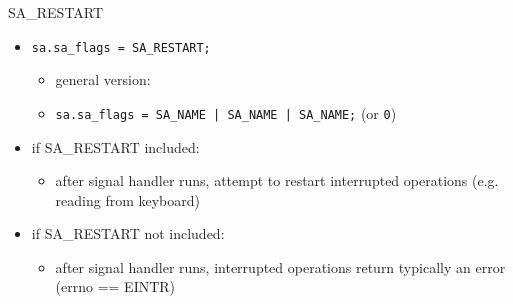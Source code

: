 
\begin{frame}{SA\_RESTART}
    \begin{itemize}
    \item \texttt{sa.sa\_flags = SA\_RESTART;}
        \begin{itemize}
        \item general version:
        \item \texttt{sa.sa\_flags = SA\_NAME | SA\_NAME | SA\_NAME;} (or \texttt{0})
        \end{itemize}
    \item if SA\_RESTART included:
        \begin{itemize}
        \item after signal handler runs, attempt to restart interrupted operations
                (e.g. reading from keyboard)
        \end{itemize}
    \item if SA\_RESTART not included:
        \begin{itemize}
        \item after signal handler runs, interrupted operations return
            typically an error (errno == EINTR)
        \end{itemize}
    \end{itemize}
\end{frame}
